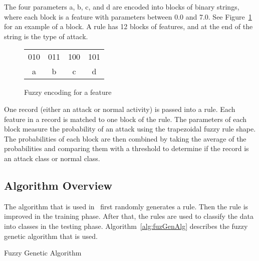 \documentclass{sig-alternate}
\begin{document}
The four parameters a, b, c, and d are encoded into blocks of binary strings, where each block is a feature with parameters between 0.0 and 7.0. See Figure~\ref{fig:fuzEncodingForFeature} for an example of a block. A rule has 12 blocks of features, and at the end of the string is the type of attack.

\begin{figure}
\centering
\caption{Fuzzy encoding for a feature}
\begin{tabular}{|c|c|c|c|} \hline
010 & 011 & 100 & 101\\
a & b & c & d\\
\hline\end{tabular}
\label{fig:fuzEncodingForFeature}
\end{figure}

One record (either an attack or normal activity) is passed into a rule. Each feature in a record is matched to one block of the rule. The parameters of each block measure the probability of an attack using the trapezoidal fuzzy rule shape. The probabilities of each block are then combined by taking the average of the probabilities and comparing them with a threshold to determine if the record is an attack class or normal class.




\subsection{Algorithm Overview}
The algorithm that is used in~\cite{6496342, 6559603} first randomly generates a rule. Then the rule is improved in the training phase. After that, the rules are used to classify the data into classes in the testing phase. Algorithm~\ref{alg:fuzGenAlg} describes the fuzzy genetic algorithm that is used. 

\begin{algorithm}
\caption{Fuzzy Genetic Algorithm}
\label{alg:fuzGenAlg}
\begin{algorithmic}

    \ENDFOR
    
      \ELSE {}
    \ENDIF
  \ENDFOR
  
\ENDFOR
{}
\end{algorithmic}
\end{algorithm}
\end{document}
